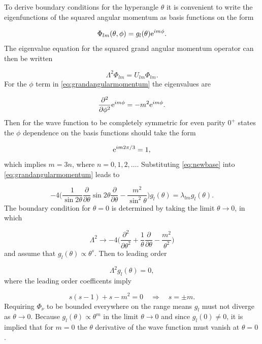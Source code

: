 To derive boundary conditions for the hyperangle $\theta$ it is convenient to write the eigenfunctions of the squared angular momentum as basis functions on the form

\begin{equation}\label{eq:newbase}
\Phi_{l m}(\theta,\phi) = g_{l}(\theta) \mathrm{e}^{ i m \phi}. 
\end{equation}
The eigenvalue equation for the squared grand angular momentum operator can then be written

\begin{equation}\label{eq:eigenlambda}
\Lambda^2 \Phi_{l m} = U_{lm}\Phi_{l m}.
\end{equation} 
For the $\phi$ term in \eqref{eq:grandangularmomentum} the eigenvalues are 

\begin{equation}
\frac{\partial^{2}}{\partial \phi^{2}} \mathrm{e}^{ i m \phi} = -m^{2} \mathrm{e}^{ i m \phi}.
\end{equation}
Then for the wave function to be completely symmetric for even parity $0^+$ states the $\phi$ dependence on the basis functions should take the form

\begin{equation}
\mathrm{e}^{ i m 2\pi/3} = 1,
\end{equation} 
which implies $m = 3n$, where $n=0,1,2,\ldots$. Substituting \eqref{eq:newbase} into  \eqref{eq:grandangularmomentum} leads to

\begin{equation}
 -4\Bigg(\frac{1}{\sin 2\theta} \frac{\partial}{\partial \theta} \sin 2\theta \frac{\partial}{\partial \theta} - \frac{m^{2}}{\sin^{2}\theta}\Bigg) g_{l}(\theta) = \lambda_{l m} g_{l}(\theta).
\end{equation}
The boundary condition for $\theta=0$ is determined by taking the limit $\theta \rightarrow 0$, in which  

\begin{equation}
\Lambda^{2} \rightarrow -4\Bigg(\frac{\partial^{2}}{\partial \theta^{2}} + \frac{1}{\theta} \frac{\partial}{\partial \theta} - \frac{m^{2}}{\theta^{2}}\Bigg)
\end{equation}
and assume that $g_l(\theta) \propto \theta^s$. Then to leading order 

\begin{equation}
\Lambda^{2} g_l(\theta) = 0,  
\end{equation}
where the leading order coefficents imply

\begin{equation}
s(s-1)+s-m^2 = 0 \quad \Rightarrow \quad s=\pm m.
\end{equation}
Requiring $\Phi_{\nu}$ to be bounded everywhere on the range means $g_l$ must not diverge as $\theta \rightarrow 0$. Because $g_l(\theta) \propto \theta^m$ in the limit $\theta \rightarrow 0$ and since $g_l(0) \neq 0$, it is implied that for $m = 0$ the $\theta$ derivative of the wave function must vanish at $\theta=0$. 

